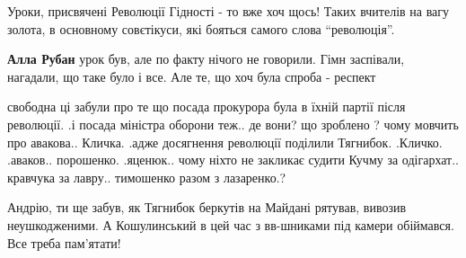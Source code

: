 \begin{itemize}

Уроки, присвячені Революції Гідності - то вже хоч щось! Таких вчителів на вагу
золота, в основному совєтікуси, які бояться самого слова \enquote{революція}.

\begin{itemize} %
\textbf{Алла Рубан} урок був, але по факту нічого не говорили. Гімн заспівали, нагадали, що таке було і все. Але те, що хоч була спроба - респект
\end{itemize} %


свободна ці забули про те що посада прокурора була в їхній партії після
революції. .і посада міністра оборони теж.. де вони? що зроблено ? чому мовчить
про авакова.. Кличка. .адже досягнення революції поділили Тягнибок. .Кличко.
.аваков.. порошенко. .яценюк.. чому ніхто не закликає судити Кучму за
одігархат.. кравчука за лавру.. тимошенко разом з лазаренко.?


Андрію, ти ще забув, як Тягнибок беркутів на Майдані рятував, вивозив
неушкодженими. А Кошулинський в цей час з вв-шниками під камери обіймався. Все
треба пам'ятати!

\end{itemize} %
